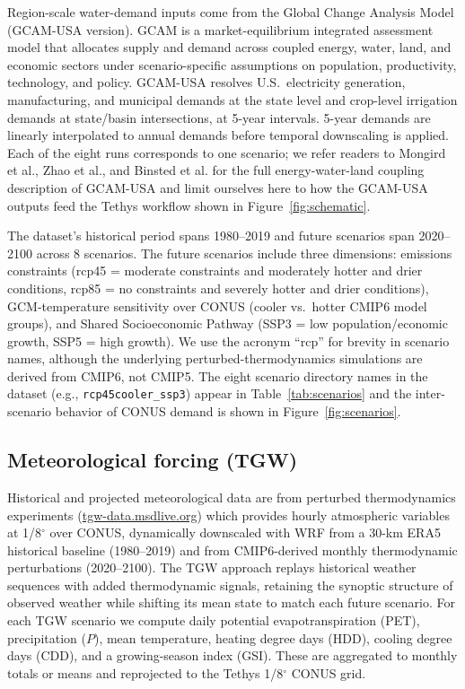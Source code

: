 \documentclass[fleqn,10pt]{wlscirep}
\begin{document}
Region-scale water-demand inputs come from the Global Change Analysis Model (GCAM-USA version)\cite{Zhao_gcamusa_water,Zhao2024,Calvin2019GCAM,Binsted_2022}. GCAM is a market-equilibrium integrated assessment model that allocates supply and demand across coupled energy, water, land, and economic sectors under scenario-specific assumptions on population, productivity, technology, and policy. GCAM-USA resolves U.S.\ electricity generation, manufacturing, and municipal demands at the state level and crop-level irrigation demands at state/basin intersections, at 5-year intervals. 5-year demands are linearly interpolated to annual demands before temporal downscaling is applied. Each of the eight runs corresponds to one scenario; we refer readers to Mongird et al.\cite{Mongird2025CERF}, Zhao et al.\cite{Zhao_gcamusa_water}, and Binsted et al.\cite{Binsted_2022} for the full energy-water-land coupling description of GCAM-USA and limit ourselves here to how the GCAM-USA outputs feed the Tethys workflow shown in Figure~\ref{fig:schematic}.

The dataset's historical period spans 1980--2019 and future scenarios span 2020--2100 across 8 scenarios\cite{Zhao_gcamusa_water,Zhao2024,Mongird2025CERF}. The future scenarios include three dimensions: emissions constraints (rcp45 = moderate constraints and moderately hotter and drier conditions, rcp85 = no constraints and severely hotter and drier conditions), GCM-temperature sensitivity over CONUS (cooler vs.\ hotter CMIP6 model groups), and Shared Socioeconomic Pathway (SSP3 = low population/economic growth, SSP5 = high growth). We use the acronym ``rcp'' for brevity in scenario names, although the underlying perturbed-thermodynamics simulations are derived from CMIP6, not CMIP5\cite{Mongird2025CERF}. The eight scenario directory names in the dataset (e.g., \texttt{rcp45cooler\_ssp3}) appear in Table~\ref{tab:scenarios} and the inter-scenario behavior of CONUS demand is shown in Figure~\ref{fig:scenarios}.

\subsection*{Meteorological forcing (TGW)}

Historical and projected meteorological data are from perturbed thermodynamics experiments \cite{Jones2023TGW} (\href{https://tgw-data.msdlive.org/}{tgw-data.msdlive.org}) which provides hourly atmospheric variables at 1/8$^{\circ}$ over CONUS, dynamically downscaled with WRF from a 30-km ERA5 historical baseline (1980--2019) and from CMIP6-derived monthly thermodynamic perturbations (2020--2100). The TGW approach replays historical weather sequences with added thermodynamic signals, retaining the synoptic structure of observed weather while shifting its mean state to match each future scenario. For each TGW scenario we compute daily potential evapotranspiration (PET), precipitation ($P$), mean temperature, heating degree days (HDD), cooling degree days (CDD), and a growing-season index (GSI). These are aggregated to monthly totals or means and reprojected to the Tethys 1/8$^{\circ}$ CONUS grid.
\end{document}
